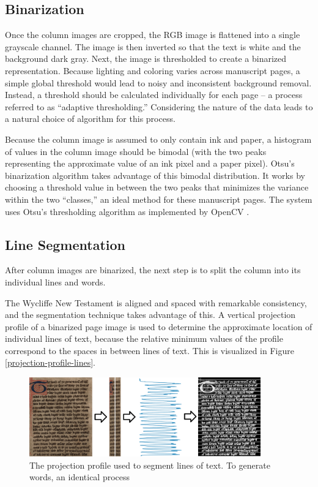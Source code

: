 \documentclass[final]{ukthesis}
\begin{document}
\subsection{Binarization}
Once the column images are cropped, the RGB image is flattened into a single grayscale channel. The image is then inverted so that the text is white and the background dark gray. Next, the image is thresholded to create a binarized representation. Because lighting and coloring varies across manuscript pages, a simple global threshold would lead to noisy and inconsistent background removal. Instead, a threshold should be calculated individually for each page -- a process referred to as ``adaptive thresholding.'' Considering the nature of the data leads to a natural choice of algorithm for this process.

Because the column image is assumed to only contain ink and paper, a histogram of values in the column image should be bimodal (with the two peaks representing the approximate value of an ink pixel and a paper pixel). Otsu's binarization algorithm  \cite{otsu1979threshold} takes advantage of this bimodal distribution. It works by choosing a threshold value in between the two peaks that minimizes the variance within the two ``classes,'' an ideal method for these manuscript pages. The system uses Otsu's thresholding algorithm as implemented by OpenCV \cite{bradski2000opencv}.


\subsection{Line Segmentation}
After column images are binarized, the next step is to split the column into its individual lines and words.

The Wycliffe New Testament is aligned and spaced with remarkable consistency, and the segmentation technique takes advantage of this. A vertical projection profile of a binarized page image is used to determine the approximate location of individual lines of text, because the relative minimum values of the profile correspond to the spaces in between lines of text. This is visualized in Figure \ref{projection-profile-lines}.

\begin{figure}[h]
\begin{center}
\includegraphics[width=10cm]{projection-profile-lines}
\end{center}
\caption{The projection profile used to segment lines of text. To generate words, an identical process}
\label{fig:projection-profile-lines}
\end{figure}
\end{document}
